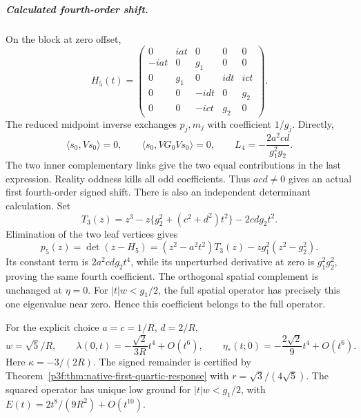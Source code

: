 \documentclass[11pt,a4paper]{article}
\begin{document}
\subparagraph{Calculated fourth-order shift.}
On the block at zero offset,
\[
 H_5(t)=\begin{pmatrix}
 0&iat&0&0&0\\-iat&0&g_1&0&0\\
 0&g_1&0&idt&ict\\0&0&-idt&0&g_2\\0&0&-ict&g_2&0
 \end{pmatrix}.
\]
The reduced midpoint inverse exchanges \(p_j,m_j\) with coefficient
\(1/g_j\). Directly,
\[
 \langle s_0,Vs_0\rangle=0,\qquad
 \langle s_0,VG_0Vs_0\rangle=0,\qquad
 L_4=-\frac{2a^2cd}{g_1^2g_2}.
\]
The two inner complementary links give the two equal contributions in
the last expression. Reality oddness kills all odd coefficients.
Thus \(acd\ne0\) gives an actual first fourth-order signed shift.
There is also an independent determinant calculation. Set
\[
 T_3(z)=z^3-z\{g_2^2+(c^2+d^2)t^2\}-2cdg_2t^2.
\]
Elimination of the two leaf vertices gives
\begin{equation}
 p_5(z)=\det(z-H_5)=(z^2-a^2t^2)T_3(z)
                      -zg_1^2(z^2-g_2^2).
 \label{p3f:eq:native-mixed-quartic-characteristic}
\end{equation}
Its constant term is \(2a^2cdg_2t^4\), while its unperturbed derivative
at zero is \(g_1^2g_2^2\), proving the same fourth coefficient.
The orthogonal spatial complement is unchanged at \(\eta=0\). For
\(|t|w<g_1/2\), the full spatial operator has precisely this one
eigenvalue near zero. Hence this coefficient belongs to the full operator.

For the explicit choice \(a=c=1/R\), \(d=2/R\),
\begin{equation}
 w=\sqrt5/R,\qquad
 \lambda(0,t)=-\frac{\sqrt2}{3R}t^4+O(t^6),\qquad
 \eta_*(t;0)=-\frac{2\sqrt2}{9}t^4+O(t^6).
 \label{p3f:eq:native-mixed-explicit-fourth}
\end{equation}
Here \(\kappa=-3/(2R)\). The signed remainder is certified by Theorem~\ref{p3f:thm:native-first-quartic-response} with \(r=\sqrt3/(4\sqrt5)\).
The squared operator has unique low ground for \(|t|w<g_1/2\), with
\(E(t)=2t^8/(9R^2)+O(t^{10})\).
\end{document}
